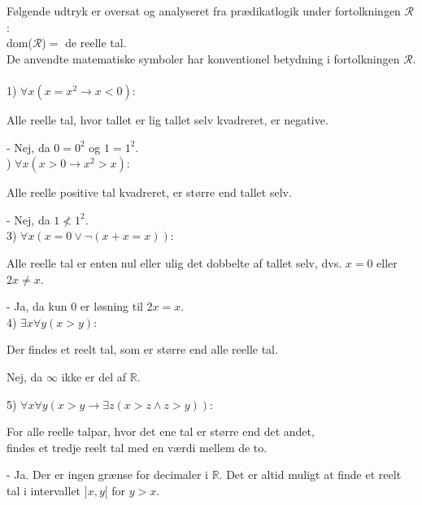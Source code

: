 Følgende udtryk er oversat og analyseret fra prædikatlogik under fortolkningen $\mathcal{R}$:\\

dom($\mathcal{R}$)$=$ de reelle tal.\\
De anvendte matematiske symboler har konventionel betydning i fortolkningen $\mathcal{R}$. \\
\\
1) $\forall x(x=x^2 \rightarrow x < 0)$:
\begin{center}
Alle reelle tal, hvor tallet er lig tallet selv kvadreret, er negative.
\end{center}
\hspace{7 cm} - Nej, da $0 = 0^2$ og $1=1^2$. \\

) $\forall x(x>0 \rightarrow x^2 > x)$:
\begin{center}
Alle reelle positive tal kvadreret, er større end tallet selv.
\end{center}
\hspace{7 cm} - Nej, da $1 \nless 1^2$.  \\

3) $\forall x(x=0 \vee \neg(x+x=x))$:
\begin{center}
Alle reelle tal er enten nul eller ulig det dobbelte af tallet selv, dvs. $x=0$ eller $2x \ne x$.
\end{center}
\hspace{7 cm} - Ja, da kun $0$ er løsning til $2x=x$.  \\

4) $\exists x\forall y(x>y)$:
\begin{center}
Der findes et reelt tal, som er større end alle reelle tal.
\end{center}
\hspace{7 cm} Nej, da $\infty$ ikke er del af $\mathds{R}$.

5) $\forall x\forall y(x>y \rightarrow \exists z(x>z \wedge z>y))$:
\begin{center}
For alle reelle talpar, hvor det ene tal er større end det andet,\\ findes et tredje reelt tal med en værdi mellem de to.
\end{center}
\hspace{7 cm} - Ja. Der er ingen grænse for decimaler i $\mathds{R}$. Det er altid muligt at finde et reelt tal i intervallet $]x,y[$ for $y>x$.